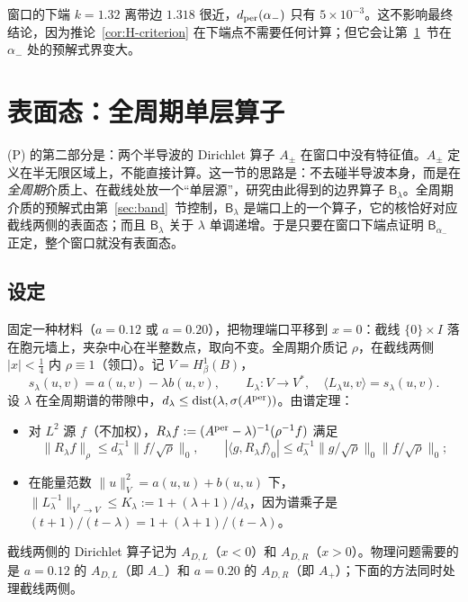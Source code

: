 \documentclass[11pt,a4paper,fontset=fandol]{ctexart}
\begin{document}
\begin{remark}
窗口的下端 $k=1.32$ 离带边 $1.318$ 很近，$d_{\rm per}(\alpha_-)$ 只有 $5\times10^{-3}$。这不影响最终结论，因为推论~\ref{cor:H-criterion} 在下端点不需要任何计算；但它会让第~\ref{sec:surface}~节在 $\alpha_-$ 处的预解式界变大。
\end{remark}

\section{表面态：全周期单层算子}
\label{sec:surface}
(P) 的第二部分是：两个半导波的 Dirichlet 算子 $A_\pm$ 在窗口中没有特征值。$A_\pm$ 定义在半无限区域上，不能直接计算。这一节的思路是：不去碰半导波本身，而是在\emph{全周期}介质上、在截线处放一个“单层源”，研究由此得到的边界算子 $\mathsf B_\lambda$。全周期介质的预解式由第~\ref{sec:band}~节控制，$\mathsf B_\lambda$ 是端口上的一个算子，它的核恰好对应截线两侧的表面态；而且 $\mathsf B_\lambda$ 关于 $\lambda$ 单调递增。于是只要在窗口下端点证明 $\mathsf B_{\alpha_-}$ 正定，整个窗口就没有表面态。

\subsection{设定}

固定一种材料（$a=0.12$ 或 $a=0.20$），把物理端口平移到 $x=0$：截线 $\{0\}\times I$ 落在胞元墙上，夹杂中心在半整数点，取向不变。全周期介质记 $\rho$，在截线两侧 $|x|<\tfrac14$ 内 $\rho\equiv1$（领口）。记 $V=H^1_\beta(B)$，
\[
s_\lambda(u,v)=a(u,v)-\lambda b(u,v),\qquad L_\lambda:V\to V^*,\quad\langle L_\lambda u,v\rangle=s_\lambda(u,v).
\]
设 $\lambda$ 在全周期谱的带隙中，$d_\lambda\le\operatorname{dist}(\lambda,\sigma(A^{\rm per}))$。由谱定理：
\begin{itemize}
\item 对 $L^2$ 源 $f$（不加权），$R_\lambda f:=(A^{\rm per}-\lambda)^{-1}(\rho^{-1}f)$ 满足
\begin{equation}
\label{eq:per-resolvent}
\|R_\lambda f\|_\rho\le d_\lambda^{-1}\|f/\sqrt\rho\|_0,\qquad |\langle g,R_\lambda f\rangle_0|\le d_\lambda^{-1}\|g/\sqrt\rho\|_0\|f/\sqrt\rho\|_0 ;
\end{equation}
\item 在能量范数 $\|u\|_V^2=a(u,u)+b(u,u)$ 下，$\|L_\lambda^{-1}\|_{V^*\to V}\le K_\lambda:=1+(\lambda+1)/d_\lambda$，因为谱乘子是 $(t+1)/(t-\lambda)=1+(\lambda+1)/(t-\lambda)$。
\end{itemize}
截线两侧的 Dirichlet 算子记为 $A_{D,L}$（$x<0$）和 $A_{D,R}$（$x>0$）。物理问题需要的是 $a=0.12$ 的 $A_{D,L}$（即 $A_-$）和 $a=0.20$ 的 $A_{D,R}$（即 $A_+$）；下面的方法同时处理截线两侧。
\end{document}
